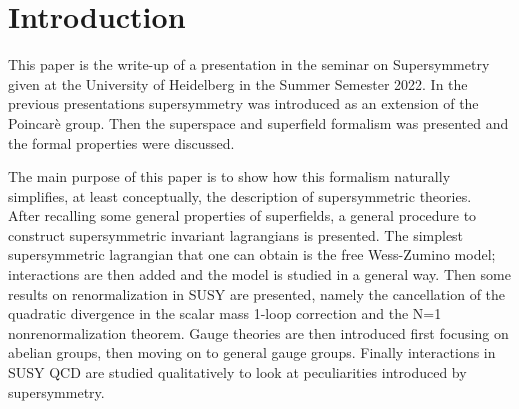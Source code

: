 \documentclass[12pt]{article}
\begin{document}
\section{Introduction}
This paper is the write-up of a presentation in the seminar on Supersymmetry given at the University of Heidelberg in the Summer Semester 2022. In the previous presentations supersymmetry was introduced as an extension of the Poincarè group. Then the superspace and superfield formalism was presented and the formal properties were discussed. \par
\vspace{5pt}
\raggedright The main purpose of this paper is to show how this formalism naturally simplifies, at least conceptually, the description of supersymmetric theories. \\
After recalling some general properties of superfields, a general procedure to construct supersymmetric invariant lagrangians is presented. The simplest supersymmetric lagrangian that one can obtain is the free Wess-Zumino model; interactions are then added and the model is studied in a general way. 
Then some results on renormalization in SUSY are presented, namely the cancellation of the quadratic divergence in the scalar mass 1-loop correction and the N=1 nonrenormalization theorem. Gauge theories are then introduced first focusing on abelian groups, then moving on to general gauge groups. Finally interactions in SUSY QCD are studied qualitatively to look at peculiarities introduced by supersymmetry.
\end{document}
